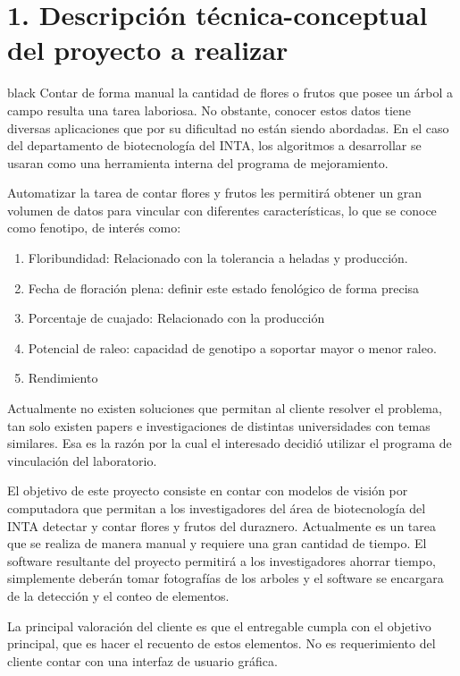 \documentclass[
11pt, %
]{charter}
\begin{document}
\section{1. Descripción técnica-conceptual del proyecto a realizar}
\label{sec:descripcion}


\begin{consigna}{black} 
Contar de forma manual la cantidad de flores o frutos que posee un árbol a campo
resulta una tarea laboriosa. No obstante, conocer estos datos tiene diversas
aplicaciones que por su dificultad no están siendo abordadas. En el caso del departamento de biotecnología del INTA, los algoritmos a desarrollar se usaran como una herramienta interna del programa de mejoramiento. 

Automatizar la tarea de contar flores y frutos les permitirá obtener un gran volumen de datos para vincular con diferentes características, lo que se conoce como fenotipo, de interés como:
\begin{enumerate}
	\item Floribundidad: Relacionado con la tolerancia a heladas y producción.
	\item Fecha de floración plena: definir este estado fenológico de forma precisa
	\item Porcentaje de cuajado: Relacionado con la producción
	\item Potencial de raleo: capacidad de genotipo a soportar mayor o menor raleo.
	\item Rendimiento
\end{enumerate}

Actualmente no existen soluciones que permitan al cliente resolver el problema, tan solo existen papers e investigaciones de distintas universidades con temas similares. Esa es la razón por la cual el interesado decidió utilizar el programa de vinculación del laboratorio.

El objetivo de este proyecto consiste en contar con modelos de visión por computadora que permitan a los investigadores del área de biotecnología del INTA detectar y contar flores y frutos del duraznero. Actualmente es un tarea que se realiza de manera manual y requiere una gran cantidad de tiempo. El software resultante del proyecto permitirá a los investigadores ahorrar tiempo, simplemente deberán tomar fotografías de los arboles y el software se encargara de la detección y el conteo de elementos.

La principal valoración del cliente es que el entregable cumpla con el objetivo principal, que es hacer el recuento de estos elementos. No es requerimiento del cliente contar con una interfaz de usuario gráfica.


\end{consigna}
\end{document}
